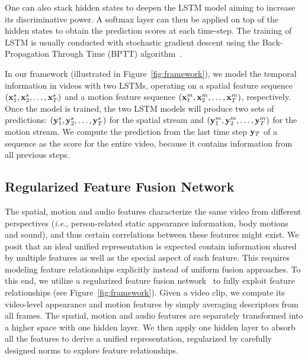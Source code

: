 \documentclass[journal]{IEEEtran}
\makeatletter
\newcommand*{\ie}{\emph{i.e.}\@\xspace}
\makeatother
\begin{document}
One can also stack hidden states to deepen the LSTM model aiming to increase its discriminative power. A softmax layer can then be applied on top of the hidden states to obtain the prediction scores at each time-step. The training of LSTM is usually conducted with stochastic gradient descent using the Back-Propagation Through Time (BPTT) algorithm~\cite{graves2005framewise}.

In our framework (illustrated in Figure~\ref{fig:framework}), we model the temporal information in videos with two LSTMs, operating on a spatial feature sequence $({\bf x}_1^s,{\bf x}_2^s,\ldots,{\bf x}_T^s)$ and a motion feature sequence $({\bf x}_1^m,{\bf x}_2^m,\ldots,{\bf x}_T^m)$, respectively. Once the model is trained, the two LSTM models will produce two sets of predictions: $({\bf y}_1^s,{\bf y}_2^s,\ldots,{\bf y}_T^s)$ for the spatial stream and $({\bf y}_1^m,{\bf y}_2^m,\ldots,{\bf y}_T^m)$ for the motion stream. We compute the prediction from the last time step ${\bf y}_T$ of a sequence as the score for the entire video, because it contains information from all previous steps.


\subsection{Regularized Feature Fusion Network}
The spatial, motion and audio features characterize the same video from different perspectives (\ie, person-related static appearance information, body motions and sound), and thus certain correlations between these features might exist. We posit that an ideal unified representation is expected contain information shared by multiple features as well as the special aspect of each feature. This requires modeling feature relationships explicitly instead of uniform fusion approaches. To this end, we utilize a regularized feature fusion network~\cite{TPAMI-fcvid} to fully exploit feature relationships (see Figure~\ref{fig:framework}). Given a video clip, we compute its video-level appearance and motion features by simply averaging descriptors from all frames. The spatial, motion and audio features are separately transformed into a higher space with one hidden layer. We then apply one hidden layer to absorb all the features to derive a unified representation, regularized by carefully designed norms to explore feature relationships.
\end{document}
